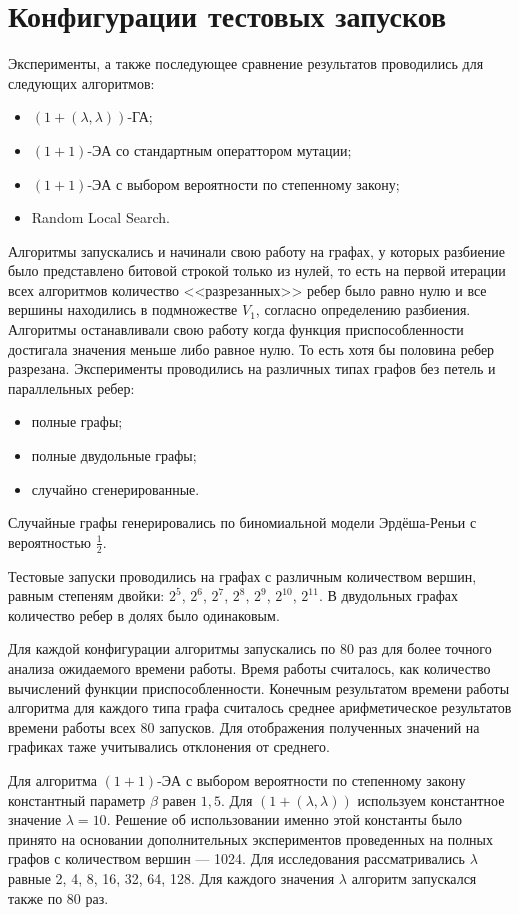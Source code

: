 \documentclass[times]{itmo-student-thesis}
\newcommand{\alglambda}{${(1 + (\lambda , \lambda))}$\xspace}
\newcommand{\alglambdaf}{${(1 + (\lambda , \lambda))}$-ГА\xspace}
\newcommand{\oea}{\mbox{$(1 + 1)$-ЭА}\xspace}
\begin{document}
\section{Конфигурации тестовых запусков}
Эксперименты, а также последующее сравнение результатов проводились для следующих алгоритмов:
\begin{itemize}
 \item \alglambdaf;
 \item \oea со стандартным операттором мутации;
 \item \oea с выбором вероятности по степенному закону;
 \item Random Local Search.
\end{itemize}
Алгоритмы запускались и начинали свою работу на графах, у которых разбиение было представлено битовой строкой только из нулей, то есть на первой итерации всех алгоритмов количество <<разрезанных>> ребер было равно нулю и все вершины находились в подмножестве $V_1$, согласно определению разбиения. Алгоритмы останавливали свою работу когда функция приспособленности достигала значения меньше либо равное нулю. То есть хотя бы половина ребер разрезана.
Эксперименты проводились на различных типах графов без петель и параллельных ребер:
\begin{itemize}
 \item полные графы;
 \item полные двудольные графы;
 \item случайно сгенерированные.
\end{itemize}
Случайные графы генерировались по биномиальной модели Эрдёша-Реньи с вероятностью $\frac{1}{2}$.

Тестовые запуски проводились на графах с различным количеством вершин, равным степеням двойки: $2^5$, $2^6$, $2^7$, $2^8$, $2^9$, $2^{10}$, $2^{11}$.
В двудольных графах количество ребер в долях было одинаковым.

Для каждой конфигурации алгоритмы запускались по 80 раз для более точного анализа ожидаемого времени работы. Время работы считалось, как количество вычислений функции приспособленности. Конечным результатом времени работы алгоритма для каждого типа графа считалось среднее арифметическое результатов времени работы всех 80 запусков. Для отображения полученных значений на графиках таже учитывались отклонения от среднего.

Для алгоритма \oea с выбором вероятности по степенному закону константный параметр $\beta$ равен $1,5$. Для \alglambda используем константное значение $\lambda = 10$.
Решение об использовании именно этой константы было принято на основании дополнительных экспериментов проведенных на полных графов с количеством вершин --- 1024. Для исследования рассматривались $\lambda$ равные 2, 4, 8, 16, 32, 64, 128. Для каждого значения $\lambda$ алгоритм запускался также по 80 раз.
\end{document}
